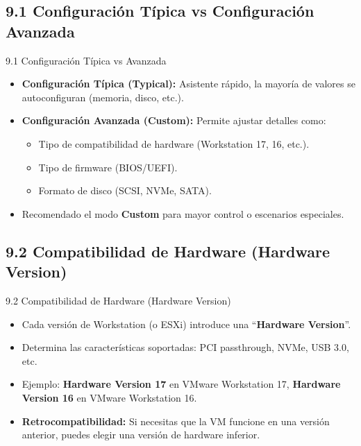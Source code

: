 \documentclass{beamer}
\begin{document}
\subsection{9.1 Configuración Típica vs Configuración Avanzada}
\begin{frame}{9.1 Configuración Típica vs Avanzada}
	\begin{itemize}
		\item \textbf{Configuración Típica (Typical):} Asistente rápido, la mayoría de valores se autoconfiguran (memoria, disco, etc.).
		\item \textbf{Configuración Avanzada (Custom):} Permite ajustar detalles como:
			\begin{itemize}
				\item Tipo de compatibilidad de hardware (Workstation 17, 16, etc.).
				\item Tipo de firmware (BIOS/UEFI).
				\item Formato de disco (SCSI, NVMe, SATA).
			\end{itemize}
		\item Recomendado el modo \textbf{Custom} para mayor control o escenarios especiales.
	\end{itemize}
\end{frame}

\subsection{9.2 Compatibilidad de Hardware (Hardware Version)}
\begin{frame}{9.2 Compatibilidad de Hardware (Hardware Version)}
	\begin{itemize}
		\item Cada versión de Workstation (o ESXi) introduce una “\textbf{Hardware Version}”.
		\item Determina las características soportadas: PCI passthrough, NVMe, USB 3.0, etc.
		\item Ejemplo: \textbf{Hardware Version 17} en VMware Workstation 17, \textbf{Hardware Version 16} en VMware Workstation 16.
		\item \textbf{Retrocompatibilidad:} Si necesitas que la VM funcione en una versión anterior, puedes elegir una versión de hardware inferior.
	\end{itemize}
\end{frame}

\end{document}
